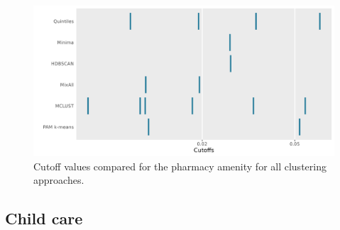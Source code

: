 \documentclass[11pt, a4paper]{article}
\begin{document}
\begin{figure}[H]
\centering
\includegraphics[width=\textwidth]{./cutoff_ticks/Pharmacy_ticks.png}
\caption[Pharmacy cutoff comparison]{Cutoff values compared for the pharmacy amenity for all clustering approaches.}\label{pharmacyticks}
\end{figure}









\pagebreak
\justifying
\subsection{Child care}
\end{document}
